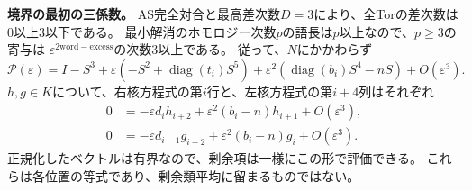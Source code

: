 \documentclass[11pt,a4paper]{ltjsarticle}
\theoremstyle{definition}
\begin{document}
\par\smallskip\noindent\textbf{境界の最初の三係数。}\quad
AS完全対合と最高差次数$D=3$により、全Torの差次数は0以上3以下である。
最小解消のホモロジー次数$p$の語長は$p$以上なので、$p\ge3$の寄与は
$\varepsilon^{2\mathrm{word}-\mathrm{excess}}$の次数3以上である。
従って、$N$にかかわらず
\begin{equation}\label{d3:eq:boundary-first-coefficients}
\mathscr P(\varepsilon)=I-S^3+\varepsilon(-S^2+\operatorname{diag}(t_i)S^5)
+\varepsilon^2(\operatorname{diag}(b_i)S^4-nS)+O(\varepsilon^3).
\end{equation}
$h,g\in K$について、右核方程式の第$i$行と、左核方程式の第$i+4$列はそれぞれ
\begin{align}
0&=-\varepsilon d_i h_{i+2}
   +\varepsilon^2(b_i-n)h_{i+1}+O(\varepsilon^3),
   \label{d3:eq:right-pointwise}\\
0&=-\varepsilon d_{i-1}g_{i+2}
   +\varepsilon^2(b_i-n)g_i+O(\varepsilon^3).
   \label{d3:eq:left-pointwise}
\end{align}
正規化したベクトルは有界なので、剰余項は一様にこの形で評価できる。
これらは各位置の等式であり、剰余類平均に留まるものではない。
\end{document}
